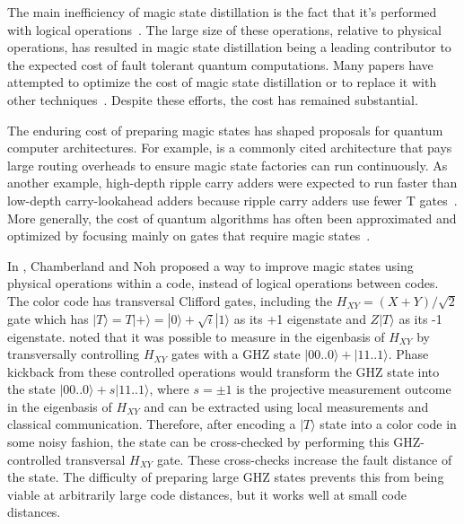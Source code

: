 \documentclass[onecolumn,unpublished,a4paper]{quantumarticle}
\theoremstyle{definition}
\begin{document}
The main inefficiency of magic state distillation is the fact that it's performed with logical operations~\cite{fowler2012surfacecodereview,gidney2019catalyzeddistillation,litinski2019notascostly}.
The large size of these operations, relative to physical operations, has resulted in magic state distillation being a leading contributor to the expected cost of fault tolerant quantum computations.
Many papers have attempted to optimize the cost of magic state distillation or to replace it with other techniques~\cite{fowler2012surfacecodereview,fowler2012bridge,li2015,fowler2018latticesurgery,gidney2019autoccz,litinski2019notascostly,singh2022,gidney2023hook,hirano2024zeroleveldistill,itogawa2024zeroleveldistilldistill,lee2024colordistillation,brown2019transversalccz,beverland2021codeswitch,vasmer2019threedsurfacecode,bombin2018threedcolorcode,chamberland2020colorinjection,heussen2024}.
Despite these efforts, the cost has remained substantial.

The enduring cost of preparing magic states has shaped proposals for quantum computer architectures.
For example, \cite{litinski2018} is a commonly cited architecture that pays large routing overheads to ensure magic state factories can run continuously.
As another example, high-depth ripple carry adders were expected to run faster than low-depth carry-lookahead adders because ripple carry adders use fewer T gates~\cite{gidney2017factoring,gidney2020blockadder}.
More generally, the cost of quantum algorithms has often been approximated and optimized by focusing mainly on gates that require magic states~\cite{lee2021hypercontraction,campbell2017shortgate,maslov2016,heyfron2018,kissinger2020}.

In \cite{chamberland2020colorinjection}, Chamberland and Noh proposed a way to improve magic states using physical operations within a code, instead of logical operations between codes.
The color code has transversal Clifford gates, including the $H_{XY} = (X + Y) / \sqrt{2}$ gate which has $|T\rangle = T|+\rangle = |0\rangle + \sqrt{i}|1\rangle$ as its +1 eigenstate and $Z|T\rangle$ as its -1 eigenstate.
\cite{chamberland2020colorinjection} noted that it was possible to measure in the eigenbasis of $H_{XY}$ by transversally controlling $H_{XY}$ gates with a GHZ state $|00..0\rangle + |11..1\rangle$.
Phase kickback from these controlled operations would transform the GHZ state into the state $|00..0\rangle + s|11..1\rangle$, where $s = \pm 1$ is the projective measurement outcome in the eigenbasis of $H_{XY}$ and can be extracted using local measurements and classical communication.
Therefore, after encoding a $|T\rangle$ state into a color code in some noisy fashion, the state can be cross-checked by performing this GHZ-controlled transversal $H_{XY}$ gate.
These cross-checks increase the fault distance of the state.
The difficulty of preparing large GHZ states prevents this from being viable at arbitrarily large code distances, but it works well at small code distances.
\end{document}
